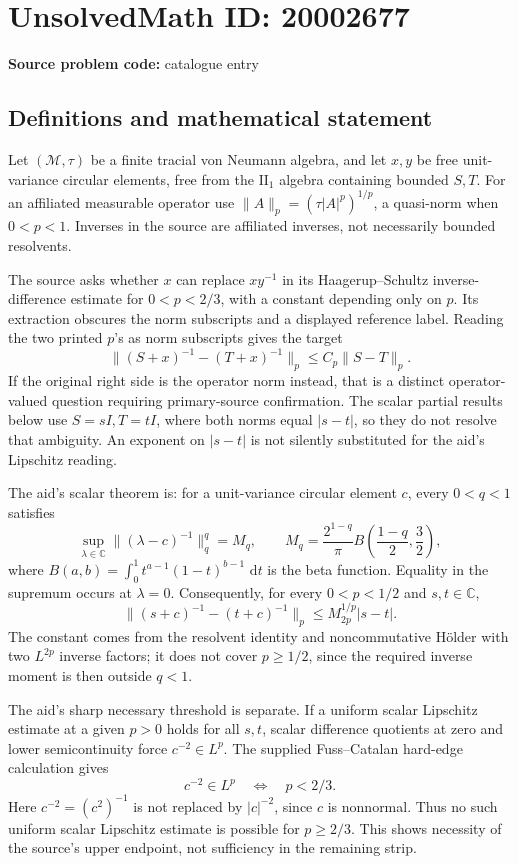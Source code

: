 \documentclass[11pt]{article}
\newcommand{\C}{\mathbb{C}}
\newcommand{\dd}{\,\mathrm{d}}
\begin{document}
\section*{UnsolvedMath ID: 20002677}
\textbf{Source problem code:} catalogue entry
\subsection{Definitions and mathematical statement}
Let \((\mathcal M,\tau)\) be a finite tracial von Neumann algebra, and let \(x,y\) be free unit-variance circular elements, free from the \(\mathrm{II}_1\) algebra containing bounded \(S,T\). For an affiliated measurable operator use \(\|A\|_p=(\tau|A|^p)^{1/p}\), a quasi-norm when \(0<p<1\). Inverses in the source are affiliated inverses, not necessarily bounded resolvents.

The source asks whether \(x\) can replace \(xy^{-1}\) in its Haagerup--Schultz inverse-difference estimate for \(0<p<2/3\), with a constant depending only on \(p\). Its extraction obscures the norm subscripts and a displayed reference label. Reading the two printed \(p\)'s as norm subscripts gives the target
\[
 \|(S+x)^{-1}-(T+x)^{-1}\|_p\le C_p\|S-T\|_p.
\]
If the original right side is the operator norm instead, that is a distinct operator-valued question requiring primary-source confirmation. The scalar partial results below use \(S=sI,T=tI\), where both norms equal \(|s-t|\), so they do not resolve that ambiguity. An exponent on \(|s-t|\) is not silently substituted for the aid's Lipschitz reading.

The aid's scalar theorem is: for a unit-variance circular element \(c\), every \(0<q<1\) satisfies
\[
 \sup_{\lambda\in\C}\|(\lambda-c)^{-1}\|_q^q=M_q,
 \qquad
 M_q=\frac{2^{1-q}}\pi B\left(\frac{1-q}{2},\frac32\right),
\]
where \(B(a,b)=\int_0^1t^{a-1}(1-t)^{b-1}\,\dd t\) is the beta function. Equality in the supremum occurs at \(\lambda=0\). Consequently, for every \(0<p<1/2\) and \(s,t\in\C\),
\[
 \|(s+c)^{-1}-(t+c)^{-1}\|_p
 \le M_{2p}^{1/p}|s-t|.
\]
The constant comes from the resolvent identity and noncommutative H\"older with two \(L^{2p}\) inverse factors; it does not cover \(p\ge1/2\), since the required inverse moment is then outside \(q<1\).

The aid's sharp necessary threshold is separate. If a uniform scalar Lipschitz estimate at a given \(p>0\) holds for all \(s,t\), scalar difference quotients at zero and lower semicontinuity force \(c^{-2}\in L^p\). The supplied Fuss--Catalan hard-edge calculation gives
\[
 c^{-2}\in L^p\quad\Longleftrightarrow\quad p<2/3.
\]
Here \(c^{-2}=(c^2)^{-1}\) is not replaced by \(|c|^{-2}\), since \(c\) is nonnormal. Thus no such uniform scalar Lipschitz estimate is possible for \(p\ge2/3\). This shows necessity of the source's upper endpoint, not sufficiency in the remaining strip.
\end{document}
